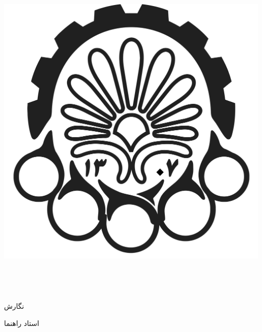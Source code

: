 
\begin{center}

\includegraphics[scale=0.045]{front/template/images/1.png}

\vspace{-0.2cm}
\ThesisUniversity \\[-0.3em]
\ThesisDepartment

\begin{large}
\vspace{0.5cm}

\ThesisType \ \ThesisDegree \\[-0.3em]
\ThesisMajor

\end{large}

\vspace{2cm}

{\LARGE\textbf{\ThesisTitle}}

\vspace{2cm}

{نگارش}\\[.5em]
{\large\textbf{\ThesisAuthor}}

\vspace{0.7cm}

{استاد راهنما}\\[.5em]
{\large\textbf{\ThesisSupervisor}}

\vspace{1.3cm}

\ThesisDate

\end{center}

\newpage
